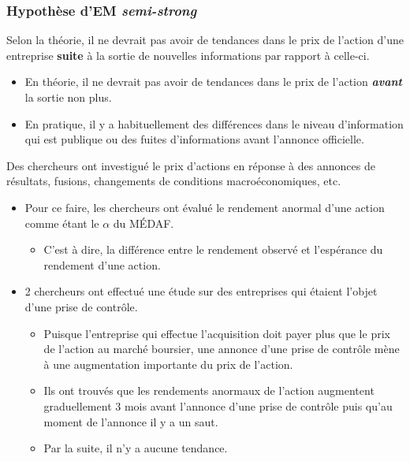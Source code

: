 \documentclass[10pt, french]{article}
\begin{document}
\begin{multicols*}{2}
\subsubsection{Hypothèse d'EM \og \textit{semi-strong} \fg{}}
Selon la théorie, il ne devrait pas avoir de tendances dans le prix de l'action d'une entreprise \textbf{suite} à la sortie de nouvelles informations par rapport à celle-ci.
\begin{itemize}
	\item	En théorie, il ne devrait pas avoir de tendances dans le prix de l'action \textit{\textbf{avant}} la sortie non plus. 
	\item	En pratique, il y a habituellement des différences dans le niveau d'information qui est publique ou des fuites d'informations avant l'annonce officielle.
\end{itemize}

Des chercheurs ont investigué le prix d'actions en réponse à des annonces de résultats, fusions, changements de conditions macroéconomiques, etc.
\begin{itemize}
	\item	Pour ce faire, les chercheurs ont évalué le rendement anormal d'une action comme étant le $\alpha$ du MÉDAF.
		\begin{itemize}
		\item	C'est à dire, la différence entre le rendement observé et l'espérance du rendement d'une action.
		\end{itemize}
	\item	2 chercheurs ont effectué une étude sur des entreprises qui étaient l'objet d'une prise de contrôle.
		\begin{itemize}
		\item	Puisque l'entreprise qui effectue l'acquisition doit payer plus que le prix de l'action au marché boursier, une annonce d'une prise de contrôle mène à une augmentation importante du prix de l'action.
		\item	Ils ont trouvés que les rendements anormaux de l'action augmentent graduellement 3 mois avant l'annonce d'une prise de contrôle puis qu'au moment de l'annonce il y a un saut.
		\item	Par la suite, il n'y a aucune tendance.
		\end{itemize}
\end{itemize}



\end{multicols*}
\end{document}
